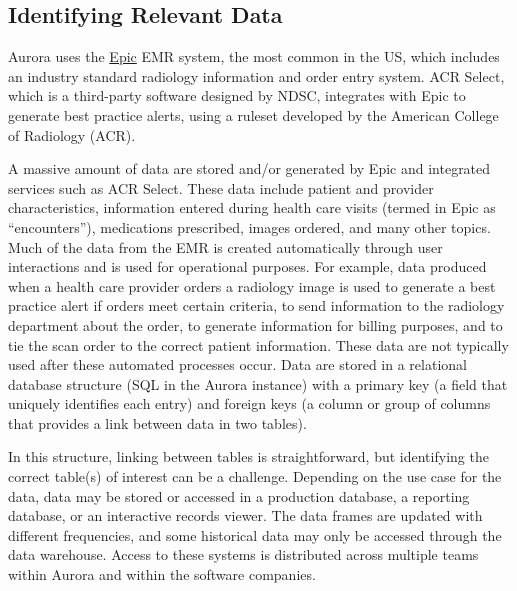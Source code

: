\hypertarget{identifying-relevant-data}{%
\subsection{Identifying Relevant Data}\label{identifying-relevant-data}}

Aurora uses the \href{https://www.epic.com/}{Epic} EMR system, the most common in the US, which includes an industry standard radiology information and order entry system. ACR Select, which is a third-party software designed by NDSC, integrates with Epic to generate best practice alerts, using a ruleset developed by the American College of Radiology (ACR).

A massive amount of data are stored and/or generated by Epic and integrated services such as ACR Select. These data include patient and provider characteristics, information entered during health care visits (termed in Epic as ``encounters''), medications prescribed, images ordered, and many other topics. Much of the data from the EMR is created automatically through user interactions and is used for operational purposes. For example, data produced when a health care provider orders a radiology image is used to generate a best practice alert if orders meet certain criteria, to send information to the radiology department about the order, to generate information for billing purposes, and to tie the scan order to the correct patient information. These data are not typically used after these automated processes occur. Data are stored in a relational database structure (SQL in the Aurora instance) with a primary key (a field that uniquely identifies each entry) and foreign keys (a column or group of columns that provides a link between data in two tables).

In this structure, linking between tables is straightforward, but identifying the correct table(s) of interest can be a challenge. Depending on the use case for the data, data may be stored or accessed in a production database, a reporting database, or an interactive records viewer. The data frames are updated with different frequencies, and some historical data may only be accessed through the data warehouse. Access to these systems is distributed across multiple teams within Aurora and within the software companies.

